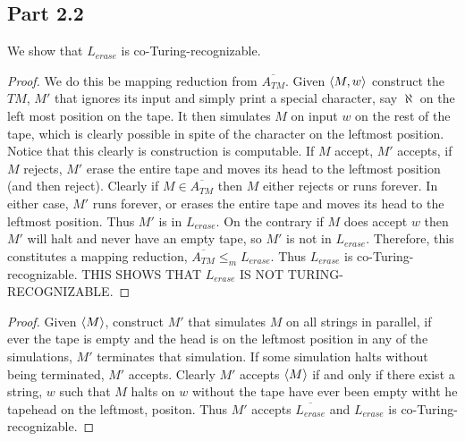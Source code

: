 \documentclass[a4paper,11pt]{article}
\numberwithin{equation}{section}
\begin{document}
\subsection*{Part 2.2}
We show that $ L_{erase} $ is co-Turing-recognizable.\begin{proof}
	We do this be mapping reduction from $ \overline{A_{TM}} $. Given $ \braket{M,w} $ construct the $ TM $, $ M' $ that ignores its input and simply print a special character, say $\aleph $ on the left most position on the tape. It then simulates $ M $ on input $ w $ on the rest of the tape, which is clearly possible in spite of the character on the leftmost position. Notice that this clearly is construction is computable.  If $ M $ accept, $ M' $ accepts, if $ M $ rejects, $ M' $ erase the entire tape and moves its head to the leftmost position (and then reject). Clearly if $ M\in\overline{A_{TM}} $ then $ M $ either rejects or runs forever. In either case, $ M' $ runs forever, or erases the entire tape and moves its head to the leftmost position. Thus $ M' $ is in $ L_{erase} $. On the contrary if $ M $ does accept $ w $ then $ M' $ will halt and never have an empty tape, so $ M' $ is not in $ L_{erase} $. Therefore, this constitutes a mapping reduction, $ \overline{A_{TM}}\leq_m L_{erase} $. Thus $ L_{erase} $ is co-Turing-recognizable. THIS SHOWS THAT $ L_{erase} $ IS NOT TURING-RECOGNIZABLE.
\end{proof}
\begin{proof}
Given $ \braket{M} $, construct $ M' $ that simulates $ M $ on all strings in parallel, if ever the tape is empty and the head is on the leftmost position in any of the simulations, $ M' $ terminates that simulation. If some simulation halts without being terminated, $ M' $ accepts. Clearly $ M' $ accepts $ \braket{M} $ if and only if there exist a string, $ w $ such that $ M $ halts on $ w $ without the tape have ever been empty witht he tapehead on the leftmost, positon. Thus $ M' $ accepts $ \overline{L_{erase}} $ and $ L_{erase} $ is co-Turing-recognizable.
\end{proof}
\end{document}
